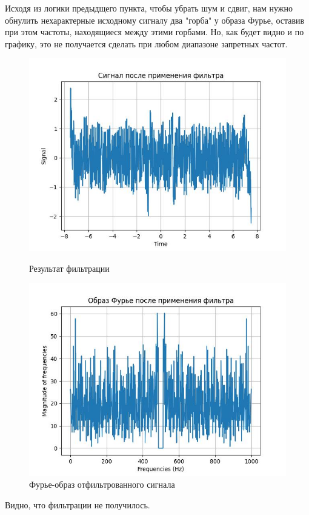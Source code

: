     \noindent Исходя из логики предыдщего пункта, чтобы убрать шум и сдвиг, нам нужно обнулить нехарактерные исходному сигналу два "горба" у образа Фурье, оставив при этом частоты, находящиеся между этими горбами. Но, как будет видно и по графику, это не получается сделать при любом диапазоне запретных частот.
    
    \clearpage
    \begin{figure}[!htb]
        \includegraphics[width=\linewidth]{../images/result/low_freq.jpeg}
        \caption{Результат фильтрации}
      \endminipage\hfill
        \includegraphics[width=\linewidth]{../images/result/low_freq_fourier.jpeg}
        \caption{Фурье-образ отфильтрованного сигнала}
      \endminipage\hfill
      \end{figure}
      \noindent Видно, что фильтрации не получилось.

